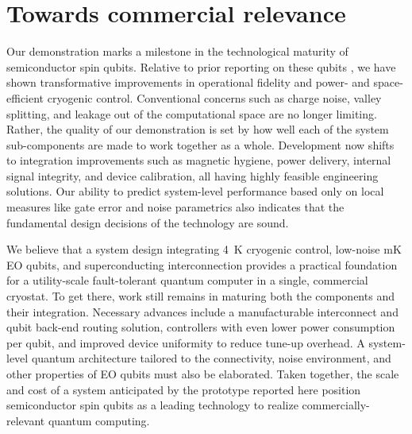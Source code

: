 \documentclass[aps,prl,twocolumn,superscriptaddress,nobibnotes,10pt,floatfix]{revtex4-2}
\begin{document}
	\section{Towards commercial relevance}\label{towards-commercial-relevance}

	Our demonstration marks a milestone in the technological maturity of semiconductor spin qubits.
	Relative to prior reporting on these qubits \cite{weinstein_universal_2023,madzik_operating_2025}, we have shown transformative improvements in operational fidelity and power- and space-efficient cryogenic control.
	Conventional concerns such as charge noise, valley splitting, and leakage out of the computational space are no longer limiting.
	Rather, the quality of our demonstration is set by how well each of the system sub-components are made to work together as a whole.
	Development now shifts to integration improvements such as magnetic hygiene, power delivery, internal signal integrity, and device calibration, all having highly feasible engineering solutions.
	Our ability to predict system-level performance based only on local measures like gate error and noise parametrics also indicates that the fundamental design decisions of the technology are sound.

	We believe that a system design integrating 4~K cryogenic control, low-noise mK EO qubits, and superconducting interconnection provides a practical foundation for a utility-scale fault-tolerant quantum computer in a single, commercial cryostat.
	To get there, work still remains in maturing both the components and their integration.
	Necessary advances include a manufacturable interconnect and qubit back-end routing solution, controllers with even lower power consumption per qubit, and improved device uniformity to reduce tune-up overhead.
	A system-level quantum architecture tailored to the connectivity, noise environment, and other properties of EO qubits must also be elaborated.
	Taken together, the scale and cost of a system anticipated by the prototype reported here position semiconductor spin qubits as a leading technology to realize commercially-relevant quantum computing.
\end{document}

